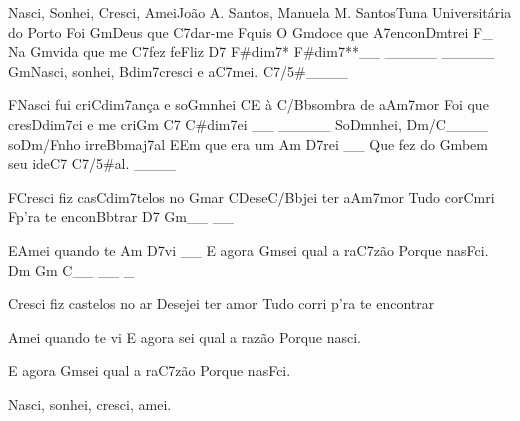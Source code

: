 \begin{musica}{Nasci, Sonhei, Cresci, Amei}{João A. Santos, Manuela M. Santos}{Tuna Universitária do Porto}
Foi \ac{Gm}{Deus} que \ac{C7}{dar}-me \ac{F}{quis}
O \ac{Gm}{do}ce que \ac{A7}{en}con\ac{Dm}{trei} \ac{F}{}_
Na \ac{Gm}{vi}da que me \ac{C7}{fez} fe\ac{F}{liz} \ac{D7 F#dim7* F#dim7**}{}__ _____ _____
\ac{Gm}{Nas}ci, sonhei, \ac{Bdim7}{cres}ci e a\ac{C7}{mei}. \ac{C7/5#}{}____

\ac{F}{Nas}ci fui cri\ac{Cdim7}{an}ça e so\ac{Gm}{nhei}
\ac{C}{E} à \ac{C/Bb}{som}bra de a\ac{Am7}{mor}
Foi que cres\ac{Ddim7}{ci} e me cri\ac{Gm C7 C#dim7}{ei} __ _____
So\ac{Dm}{nhei}, \ac{Dm/C}{}____ so\ac{Dm/F}{nho} irre\ac{Bbmaj7}{al}
\ac{E}{Em} que era um \ac{Am D7}{rei} __
Que fez do \ac{Gm}{bem} seu ide\ac{C7 C7/5#}{al}. ____

\ac{F}{Cres}ci fiz cas\ac{Cdim7}{te}los no \ac{Gm}{ar}
\ac{C}{De}se\ac{C/Bb}{jei} ter a\ac{Am7}{mor}
Tudo cor\ac{Cm}{ri} \ac{F}{p’ra} te encon\ac{Bb}{trar} \ac{D7 Gm}{}__ __

\ac{E}{Amei} quando te \ac{Am D7}{vi} __
E agora \ac{Gm}{sei} qual a ra\ac{C7}{zão}
Porque nas\ac{F}{ci}. \ac{Dm Gm C}{}__ __ _


Cresci fiz castelos no ar
Desejei ter amor
Tudo corri p’ra te encontrar

Amei quando te vi
E agora sei qual a razão
Porque nasci.

E agora \ac{Gm}{sei} qual a ra\ac{C7}{zão}
Porque nas\ac{F}{ci}.


Nasci, sonhei, cresci, amei.

\end{musica}
